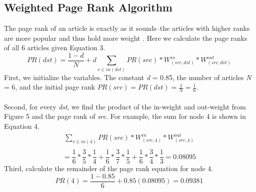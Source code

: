 \documentclass[journal]{IEEEtran}
\begin{document}
\subsection{Weighted Page Rank Algorithm}
The page rank of an article is exactly as it sounds--the articles with higher ranks are more popular and thus hold more weight \cite{weighted}. Here we calculate the page ranks of all 6 articles given Equation 3.
\begin{equation}
PR(dst)= \frac{1-d}{N}+d\sum_{v\in in(dst)}{PR(src)*W^{in}_{(src,dst)}*W^{out}_{(src,dst)}}
\end{equation}
First, we initialize the variables. The constant \emph{d} = 0.85, the number of articles \emph{N} = 6, and the initial page rank $PR(src)=PR(dst)=\frac{1}{N}=\frac{1}{6}$.\\\\
Second, for every \emph{dst}, we find the product of the in-weight and out-weight from Figure 5 and the page rank of \emph{src}. For example, the sum for node 4 is shown in Equation 4.
\begin{eqnarray*}
\sum_{v\in in(4)}{PR(src)*W^{in}_{(src,4)}*W^{out}_{(src,4)}}\\
\end{eqnarray*}
\begin{equation}
=\frac{1}{6}*\frac{3}{5}*\frac{1}{4}+\frac{1}{6}*\frac{3}{7}*\frac{1}{5}+\frac{1}{6}*\frac{3}{4}*\frac{1}{3}=0.08095
\end{equation}
Third, calculate the remainder of the page rank equation for node 4.
\begin{equation}
PR(4)=\frac{1-0.85}{6}+0.85(0.08095)=0.09381
\end{equation}
\end{document}
